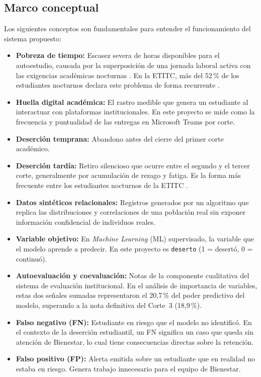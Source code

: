 \documentclass[12pt,letterpaper]{article}
\newcommand{\ML}{\textit{Machine Learning} (ML)\xspace}
\begin{document}
\subsection{Marco conceptual}

Los siguientes conceptos son fundamentales para entender el funcionamiento del sistema propuesto:

\begin{itemize}
  \item \textbf{Pobreza de tiempo:} Escasez severa de horas disponibles para el autoestudio, causada por la superposición de una jornada laboral activa con las exigencias académicas nocturnas \parencite{arias2018}. En la ETITC, más del 52\,\% de los estudiantes nocturnos declara este problema de forma recurrente \parencite{etitc_bienestar}.

  \item \textbf{Huella digital académica:} El rastro medible que genera un estudiante al interactuar con plataformas institucionales. En este proyecto se mide como la frecuencia y puntualidad de las entregas en Microsoft Teams por corte.

  \item \textbf{Deserción temprana:} Abandono antes del cierre del primer corte académico.

  \item \textbf{Deserción tardía:} Retiro silencioso que ocurre entre el segundo y el tercer corte, generalmente por acumulación de rezago y fatiga. Es la forma más frecuente entre los estudiantes nocturnos de la ETITC \parencite{etitc_bienestar}.

  \item \textbf{Datos sintéticos relacionales:} Registros generados por un algoritmo que replica las distribuciones y correlaciones de una población real sin exponer información confidencial de individuos reales.

  \item \textbf{Variable objetivo:} En \ML supervisado, la variable que el modelo aprende a predecir. En este proyecto es \texttt{deserto} (1 = desertó, 0 = continuó).

  \item \textbf{Autoevaluación y coevaluación:} Notas de la componente cualitativa del sistema de evaluación institucional. En el análisis de importancia de variables, estas dos señales sumadas representaron el 20,7\,\% del poder predictivo del modelo, superando a la nota definitiva del Corte~3 (18,9\,\%).

  \item \textbf{Falso negativo (FN):} Estudiante en riesgo que el modelo no identificó. En el contexto de la deserción estudiantil, un FN significa un caso que queda sin atención de Bienestar, lo cual tiene consecuencias directas sobre la retención.

  \item \textbf{Falso positivo (FP):} Alerta emitida sobre un estudiante que en realidad no estaba en riesgo. Genera trabajo innecesario para el equipo de Bienestar.
\end{itemize}
\end{document}
